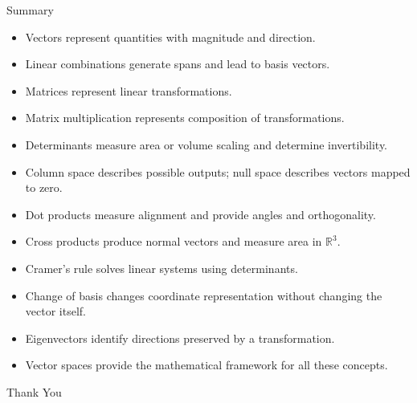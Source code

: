 \documentclass[aspectratio=169]{beamer}
\begin{document}
\begin{frame}{Summary}
\begin{itemize}
\item Vectors represent quantities with magnitude and direction.
\item Linear combinations generate spans and lead to basis vectors.
\item Matrices represent linear transformations.
\item Matrix multiplication represents composition of transformations.
\item Determinants measure area or volume scaling and determine invertibility.
\item Column space describes possible outputs; null space describes vectors mapped to zero.
\item Dot products measure alignment and provide angles and orthogonality.
\item Cross products produce normal vectors and measure area in $\mathbb R^3$.
\item Cramer's rule solves linear systems using determinants.
\item Change of basis changes coordinate representation without changing the vector itself.
\item Eigenvectors identify directions preserved by a transformation.
\item Vector spaces provide the mathematical framework for all these concepts.
\end{itemize}
\end{frame}

\begin{frame}
\centering
\Huge Thank You
\end{frame}
\end{document}
